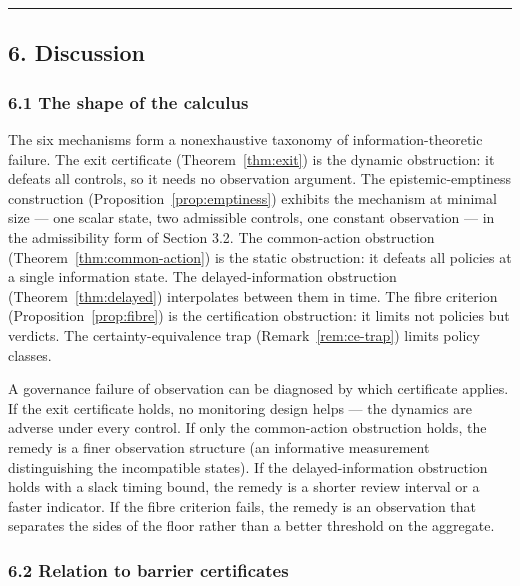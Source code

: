 \documentclass[11pt]{article}
\theoremstyle{definition}
\begin{document}
\begin{center}\rule{0.5\linewidth}{0.5pt}\end{center}

\subsection{6. Discussion}\label{discussion}

\subsubsection{6.1 The shape of the
calculus}\label{the-shape-of-the-calculus}

The six mechanisms form a nonexhaustive taxonomy of
information-theoretic failure. The exit certificate (Theorem~\ref{thm:exit}) is the
dynamic obstruction: it defeats all controls, so it needs no observation
argument. The epistemic-emptiness construction (Proposition~\ref{prop:emptiness}) exhibits the
mechanism at minimal size --- one scalar state, two admissible controls,
one constant observation --- in the admissibility form of Section 3.2. The common-action obstruction (Theorem~\ref{thm:common-action}) is the static
obstruction: it defeats all policies at a single information state. The
delayed-information obstruction (Theorem~\ref{thm:delayed}) interpolates between them in
time. The fibre criterion (Proposition~\ref{prop:fibre}) is the certification obstruction:
it limits not policies but verdicts. The certainty-equivalence trap
(Remark~\ref{rem:ce-trap}) limits policy classes.

A governance failure of observation can be diagnosed by which
certificate applies. If the exit certificate holds, no monitoring design
helps --- the dynamics are adverse under every control. If only the
common-action obstruction holds, the remedy is a finer observation
structure (an informative measurement distinguishing the incompatible
states). If the delayed-information obstruction holds with a slack
timing bound, the remedy is a shorter review interval or a faster
indicator. If the fibre criterion fails, the remedy is an observation
that separates the sides of the floor rather than a better threshold on
the aggregate.

\subsubsection{6.2 Relation to barrier
certificates}\label{relation-to-barrier-certificates}
\end{document}
